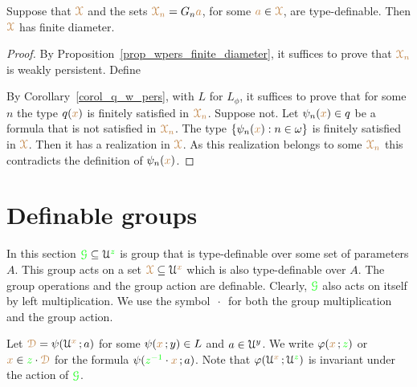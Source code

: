 \begin{theorem}
  Suppose that ${\color{brown}\EuScript X}$ and the sets ${\color{brown}\EuScript X_n}=G_n{\color{brown} a}$, for some ${\color{brown} a}\in{\color{brown}\EuScript X}$, are type-definable.
  Then ${\color{brown}\EuScript X}$ has finite diameter.
\end{theorem}

\begin{proof}
  By Proposition~\ref{prop_wpers_finite_diameter}, it suffices to prove that ${\color{brown}\EuScript X_n}$ is weakly persistent.
  Define

  
  By Corollary~\ref{corol_q_w_pers}, with $L$ for $L_\phi$, it suffices to prove that for some $n$ the type $q({\color{brown} x})$ is finitely satisfied in $\color{brown}\EuScript X_n$.
  Suppose not.
  Let $\psi_n({\color{brown} x})\in q$ be a formula that is not satisfied in $\color{brown}\EuScript X_n$.
  The type $\{\psi_n({\color{brown} x}):n\in\omega\}$ is finitely satisfied in ${\color{brown}\EuScript X}$.
  Then it has a realization in ${\color{brown}\EuScript X}$. 
  As this realization belongs to some ${\color{brown}\EuScript X_n}$ this contradicts the definition of $\psi_n({\color{brown} x})$. 
\end{proof}



\section{Definable groups}

In this section ${\color{green}\EuScript G}\subseteq\EuScript U^{\color{green} z}$ is group that is type-definable over some set of parameters $A$.
This group acts on a set ${\color{brown}\EuScript X}\subseteq\EuScript U^{\color{brown} x}$ which is also type-definable over $A$.
The group operations and the group action are definable.
Clearly, ${\color{green}\EuScript G}$ also acts on itself by left multiplication.
We use the symbol $\,\cdot\,$ for both the group multiplication and the group action.

Let ${\color{brown}\EuScript D}=\psi(\EuScript U^{\color{brown} x}\,;a)$ for some $\psi({\color{brown} x}\,;y)\in L$ and $a\in\EuScript U^y$.
We write $\varphi({\color{brown} x}\,;{\color{green} z})$ or ${\color{brown} x}\in{\color{green}z}\cdot{\color{brown}\EuScript D}$ for the formula $\psi({\color{green} z^{-1}}\cdot{\color{brown}x}\,;a)$.
Note that $\varphi(\EuScript U^{\color{brown} x}\,;\EuScript U^{\color{green} z})$ is invariant under the action of ${\color{green}\EuScript G}$.


